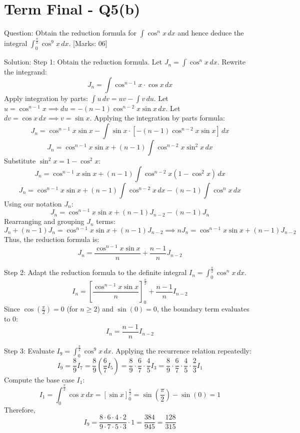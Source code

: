 \documentclass[11pt, a4paper]{article}
\begin{document}

\section*{Term Final - Q5(b)}

Question:
Obtain the reduction formula for $\int \cos^n x \, dx$ and hence deduce the integral $\int_{0}^{\frac{\pi}{2}} \cos^9 x \, dx$. [Marks: 06]

Solution:
Step 1: Obtain the reduction formula.
Let $J_n = \int \cos^n x \, dx$. Rewrite the integrand:
\[
J_n = \int \cos^{n-1} x \cdot \cos x \, dx
\]
Apply integration by parts: $\int u \, dv = uv - \int v \, du$.
Let $u = \cos^{n-1} x \implies du = -(n-1)\cos^{n-2} x \sin x \, dx$.
Let $dv = \cos x \, dx \implies v = \sin x$.
Applying the integration by parts formula:
\[
J_n = \cos^{n-1} x \sin x - \int \sin x \cdot \left[ -(n-1)\cos^{n-2} x \sin x \right] \, dx
\]
\[
J_n = \cos^{n-1} x \sin x + (n-1) \int \cos^{n-2} x \sin^2 x \, dx
\]
Substitute $\sin^2 x = 1 - \cos^2 x$:
\[
J_n = \cos^{n-1} x \sin x + (n-1) \int \cos^{n-2} x (1 - \cos^2 x) \, dx
\]
\[
J_n = \cos^{n-1} x \sin x + (n-1) \int \cos^{n-2} x \, dx - (n-1) \int \cos^n x \, dx
\]
Using our notation $J_n$:
\[
J_n = \cos^{n-1} x \sin x + (n-1) J_{n-2} - (n-1) J_n
\]
Rearranging and grouping $J_n$ terms:
\[
J_n + (n-1) J_n = \cos^{n-1} x \sin x + (n-1) J_{n-2} \implies n J_n = \cos^{n-1} x \sin x + (n-1) J_{n-2}
\]
Thus, the reduction formula is:
\[
J_n = \frac{\cos^{n-1} x \sin x}{n} + \frac{n-1}{n} J_{n-2}
\]

Step 2: Adapt the reduction formula to the definite integral $I_n = \int_{0}^{\frac{\pi}{2}} \cos^n x \, dx$.
\[
I_n = \left[ \frac{\cos^{n-1} x \sin x}{n} \right]_{0}^{\frac{\pi}{2}} + \frac{n-1}{n} I_{n-2}
\]
Since $\cos(\frac{\pi}{2}) = 0$ (for $n \ge 2$) and $\sin(0) = 0$, the boundary term evaluates to $0$:
\[
I_n = \frac{n-1}{n} I_{n-2}
\]

Step 3: Evaluate $I_9 = \int_{0}^{\frac{\pi}{2}} \cos^9 x \, dx$.
Applying the recurrence relation repeatedly:
\[
I_9 = \frac{8}{9} I_7 = \frac{8}{9} \left( \frac{6}{7} I_5 \right) = \frac{8}{9} \cdot \frac{6}{7} \cdot \frac{4}{5} I_3 = \frac{8}{9} \cdot \frac{6}{7} \cdot \frac{4}{5} \cdot \frac{2}{3} I_1
\]
Compute the base case $I_1$:
\[
I_1 = \int_{0}^{\frac{\pi}{2}} \cos x \, dx = \left[ \sin x \right]_{0}^{\frac{\pi}{2}} = \sin\left(\frac{\pi}{2}\right) - \sin(0) = 1
\]
Therefore,
\[
I_9 = \frac{8 \cdot 6 \cdot 4 \cdot 2}{9 \cdot 7 \cdot 5 \cdot 3} \cdot 1 = \frac{384}{945} = \frac{128}{315}
\]
\end{document}
